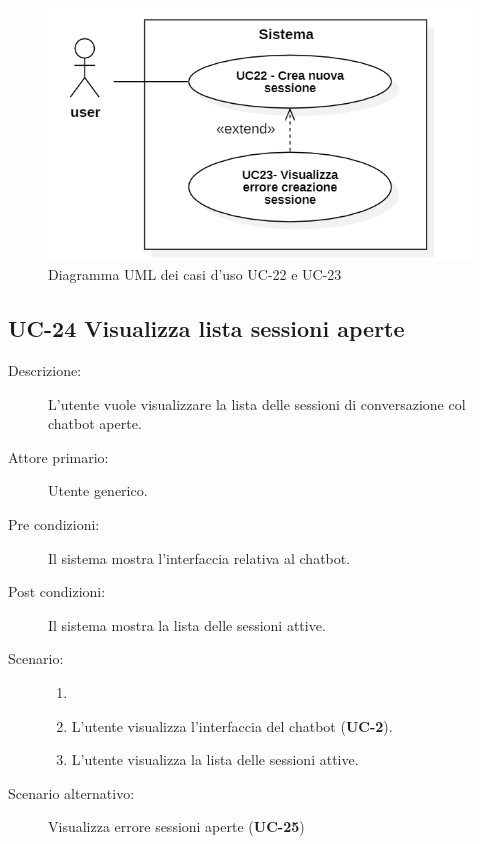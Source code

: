 \begin{figure}[H]
    \centering
    \includegraphics[width=0.8\linewidth]{UC22-23.PNG}
    \caption{Diagramma UML dei casi d'uso UC-22 e UC-23}
    \label{fig:UC22-23}
\end{figure}

\subsection{UC-24 Visualizza lista sessioni aperte}
\begin{description}
    \item[Descrizione:] L'utente vuole visualizzare la lista delle sessioni di conversazione col chatbot aperte.
    \item[Attore primario:] Utente generico.
    \item[Pre condizioni:] Il sistema mostra l'interfaccia relativa al chatbot.
    \item[Post condizioni:] Il sistema mostra la lista delle sessioni attive.
    \item[Scenario:]
    \begin{enumerate}
        \item[] 
        \item L’utente visualizza l'interfaccia del chatbot (\textbf{UC-2}).
        \item L'utente visualizza la lista delle sessioni attive.
    \end{enumerate}
    \item[Scenario alternativo:] Visualizza errore sessioni aperte (\textbf{UC-25})
\end{description}

